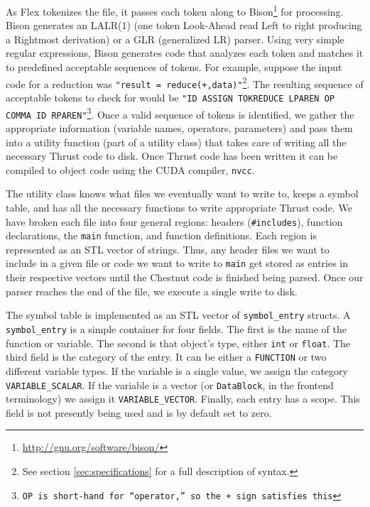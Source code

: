 \documentclass[twocolumn]{article}
\renewcommand{\|}{\origbar} %
\newcommand{\code}[1]{\texttt{#1}}
\begin{document}
As Flex tokenizes the file, it passes each token along to Bison\footnote{\url{http://gnu.org/software/bison/}} for processing. Bison generates an LALR(1) (one token Look-Ahead read Left to right producing a Rightmost derivation) or a GLR (generalized LR) parser. Using very simple regular expressions, Bison generates code that analyzes each token and matches it to predefined acceptable sequences of tokens. For example, suppose the input code for a reduction was \code{"result~=~reduce(+,data)"}\footnote{See section \ref{sec:specifications} for a full description of syntax.}. The resulting sequence of acceptable tokens to check for would be \code{"ID ASSIGN TOKREDUCE LPAREN OP COMMA ID RPAREN"\footnote{\code{OP} is short-hand for ``operator,'' so the \code{+} sign satisfies this}}. Once a valid sequence of tokens is identified, we gather the appropriate information (variable names, operators, parameters) and pass them into a utility function (part of a utility class) that takes care of writing all the necessary Thrust code to disk. Once Thrust code has been written it can be compiled to object code using the CUDA compiler, \code{nvcc}.

The utility class knows what files we eventually want to write to, keeps a symbol table, and has all the necessary functions to write appropriate Thrust code. We have broken each file into four general regions: headers (\code{\#includes}), function declarations, the \code{main} function, and function definitions. Each region is represented as an STL vector of strings. Thus, any header files we want to include in a given file or code we want to write to \code{main} get stored as entries in their respective vectors until the Chestnut code is finished being parsed. Once our parser reaches the end of the file, we execute a single write to disk.

The symbol table is implemented as an STL vector of \code{symbol\_entry} structs. A \code{symbol\_entry} is a simple container for four fields. The first is the name of the function or variable. The second is that object's type, either \code{int} or \code{float}. The third field is the category of the entry. It can be either a \code{FUNCTION} or two different variable types. If the variable is a single value, we assign the category \code{VARIABLE\_SCALAR}. If the variable is a vector (or \code{DataBlock}, in the frontend terminology) we assign it \code{VARIABLE\_VECTOR}. Finally, each entry has a scope. This field is not presently being used and is by default set to zero. 
\end{document}
